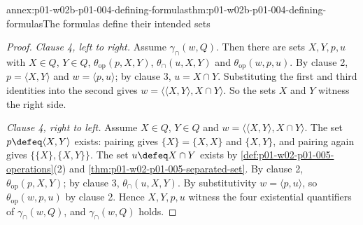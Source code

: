 \begin{annexitem}{annex:p01-w02b-p01-004-defining-formulas}{thm:p01-w02b-p01-004-defining-formulas}{The formulas define their intended sets}
\begin{proof}
\emph{Clause 4, left to right.} Assume \(\gamma_{\cap}(w,Q)\). Then there are
sets \(X,Y,p,u\) with \(X\in Q\), \(Y\in Q\), \(\theta_{\mathrm{op}}(p,X,Y)\),
\(\theta_{\cap}(u,X,Y)\) and \(\theta_{\mathrm{op}}(w,p,u)\). By clause 2,
\(p=\langle X,Y\rangle\) and \(w=\langle p,u\rangle\); by clause 3,
\(u=X\cap Y\). Substituting the first and third identities into the second gives
\(w=\langle\langle X,Y\rangle,X\cap Y\rangle\). So the sets \(X\) and \(Y\)
witness the right side.

\emph{Clause 4, right to left.} Assume \(X\in Q\), \(Y\in Q\) and
\(w=\langle\langle X,Y\rangle,X\cap Y\rangle\). The set
\(p\defeq\langle X,Y\rangle\) exists: pairing gives \(\{X\}=\{X,X\}\) and
\(\{X,Y\}\), and pairing again gives \(\{\{X\},\{X,Y\}\}\). The set
\(u\defeq X\cap Y\) exists by \cref{def:p01-w02-p01-005-operations}(2) and
\cref{thm:p01-w02-p01-005-separated-set}. By clause 2,
\(\theta_{\mathrm{op}}(p,X,Y)\); by clause 3, \(\theta_{\cap}(u,X,Y)\). By
substitutivity \(w=\langle p,u\rangle\), so \(\theta_{\mathrm{op}}(w,p,u)\) by
clause 2. Hence \(X,Y,p,u\) witness the four existential quantifiers of
\(\gamma_{\cap}(w,Q)\), and \(\gamma_{\cap}(w,Q)\) holds.
\end{proof}
\end{annexitem}

